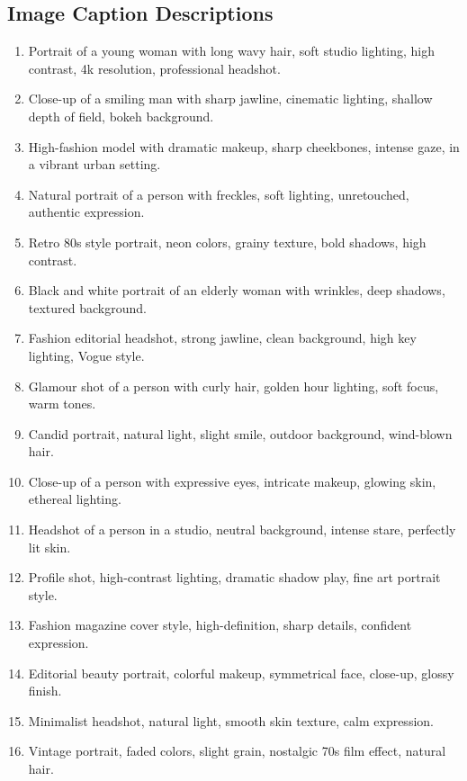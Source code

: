 \documentclass[conference]{IEEEtran}
\begin{document}
\subsection{Image Caption Descriptions} \label{app:image_captions}
\begin{enumerate}
    \item Portrait of a young woman with long wavy hair, soft studio lighting, high contrast, 4k resolution, professional headshot.
    \item Close-up of a smiling man with sharp jawline, cinematic lighting, shallow depth of field, bokeh background.
    \item High-fashion model with dramatic makeup, sharp cheekbones, intense gaze, in a vibrant urban setting.
    \item Natural portrait of a person with freckles, soft lighting, unretouched, authentic expression.
    \item Retro 80s style portrait, neon colors, grainy texture, bold shadows, high contrast.
    \item Black and white portrait of an elderly woman with wrinkles, deep shadows, textured background.
    \item Fashion editorial headshot, strong jawline, clean background, high key lighting, Vogue style.
    \item Glamour shot of a person with curly hair, golden hour lighting, soft focus, warm tones.
    \item Candid portrait, natural light, slight smile, outdoor background, wind-blown hair.
    \item Close-up of a person with expressive eyes, intricate makeup, glowing skin, ethereal lighting.
    \item Headshot of a person in a studio, neutral background, intense stare, perfectly lit skin.
    \item Profile shot, high-contrast lighting, dramatic shadow play, fine art portrait style.
    \item Fashion magazine cover style, high-definition, sharp details, confident expression.
    \item Editorial beauty portrait, colorful makeup, symmetrical face, close-up, glossy finish.
    \item Minimalist headshot, natural light, smooth skin texture, calm expression.
    \item Vintage portrait, faded colors, slight grain, nostalgic 70s film effect, natural hair.
\end{enumerate}
\end{document}
